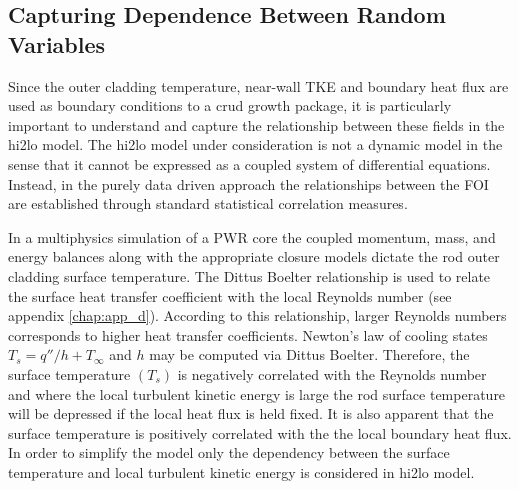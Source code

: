 \subsection{Capturing Dependence Between Random Variables}
\label{sec:dep_structure}

Since the outer cladding temperature, near-wall TKE and boundary heat flux are used as boundary conditions to a crud growth package, it is particularly important to understand and capture the relationship between these fields in the hi2lo model.  The hi2lo model under consideration is not a dynamic model in the sense that it cannot be expressed as a coupled system of differential equations.  Instead, in the purely data driven approach the relationships between the FOI are established through standard statistical correlation measures.

In a multiphysics simulation of a PWR core the coupled momentum, mass, and energy balances along with the appropriate closure models dictate the rod outer cladding surface temperature.  The Dittus Boelter relationship is used to relate the surface heat transfer coefficient with the local Reynolds number (see appendix \ref{chap:app_d}).  According to this relationship, larger Reynolds numbers corresponds to higher heat transfer coefficients.   Newton's law of cooling states $T_s = q''/h + T_{\infty}$ and $h$ may be computed via Dittus Boelter.  Therefore, the surface temperature $(T_s)$ is negatively correlated with the Reynolds number and where the local turbulent kinetic energy is large the rod surface temperature will be depressed if the local heat flux is held fixed.  It is also apparent that the surface temperature is positively correlated with the the local boundary heat flux.  In order to simplify the model only the dependency between the surface temperature and local turbulent kinetic energy is considered in hi2lo model.

